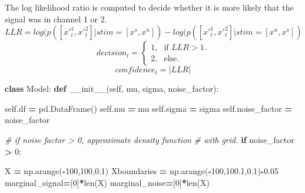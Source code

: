 \documentclass[12pt,twoside]{reedthesis}
\newenvironment{Shaded}{\begin{snugshade}}{\end{snugshade}}
\newcommand{\BuiltInTok}[1]{#1}
\newcommand{\CommentTok}[1]{\textcolor[rgb]{0.56,0.35,0.01}{\textit{#1}}}
\newcommand{\ControlFlowTok}[1]{\textcolor[rgb]{0.13,0.29,0.53}{\textbf{#1}}}
\newcommand{\DecValTok}[1]{\textcolor[rgb]{0.00,0.00,0.81}{#1}}
\newcommand{\FloatTok}[1]{\textcolor[rgb]{0.00,0.00,0.81}{#1}}
\newcommand{\FunctionTok}[1]{\textcolor[rgb]{0.00,0.00,0.00}{#1}}
\newcommand{\KeywordTok}[1]{\textcolor[rgb]{0.13,0.29,0.53}{\textbf{#1}}}
\newcommand{\NormalTok}[1]{#1}
\newcommand{\OperatorTok}[1]{\textcolor[rgb]{0.81,0.36,0.00}{\textbf{#1}}}
\newcommand{\VariableTok}[1]{\textcolor[rgb]{0.00,0.00,0.00}{#1}}
\begin{document}
The log likelihood ratio is computed to decide whether it is more likely that the signal was in channel 1 or 2.
\begin{equation}
LLR=log(p([x'^1_t,x'^2_t]|stim=[x^s,x^n])-log(p([x'^1_t,x'^2_t]|stim=[x^n,x^s])
\end{equation}
\begin{equation}
  decision_t=\begin{cases}
    \text{1}, & \text{if } LLR>1.\\
   \text{2}, & \text{else}.
    
  \end{cases}
\end{equation}
\begin{equation}
confidence_t = |LLR|
\end{equation}
\begin{Shaded}
\begin{Highlighting}[]
\KeywordTok{class}\NormalTok{ Model:}
    \KeywordTok{def} \FunctionTok{__init__}\NormalTok{(}\VariableTok{self}\NormalTok{, mu, sigma, noise_factor):}
        
        \VariableTok{self}\NormalTok{.df }\OperatorTok{=}\NormalTok{ pd.DataFrame()}
        \VariableTok{self}\NormalTok{.mu }\OperatorTok{=}\NormalTok{ mu}
        \VariableTok{self}\NormalTok{.sigma }\OperatorTok{=}\NormalTok{ sigma}
        \VariableTok{self}\NormalTok{.noise_factor }\OperatorTok{=}\NormalTok{ noise_factor}
        
        \CommentTok{# if noise factor > 0, approximate density function}
        \CommentTok{# with grid.}
        \ControlFlowTok{if}\NormalTok{ noise_factor }\OperatorTok{>} \DecValTok{0}\NormalTok{:}
        
\NormalTok{          X }\OperatorTok{=}\NormalTok{ np.arange(}\OperatorTok{-}\DecValTok{100}\NormalTok{,}\DecValTok{100}\NormalTok{,}\FloatTok{0.1}\NormalTok{)}
\NormalTok{          Xboundaries }\OperatorTok{=}\NormalTok{ np.arange(}\OperatorTok{-}\DecValTok{100}\NormalTok{,}\FloatTok{100.1}\NormalTok{,}\FloatTok{0.1}\NormalTok{)}\OperatorTok{-}\FloatTok{0.05}
\NormalTok{          marginal_signal}\OperatorTok{=}\NormalTok{[}\DecValTok{0}\NormalTok{]}\OperatorTok{*}\BuiltInTok{len}\NormalTok{(X)}
\NormalTok{          marginal_noise}\OperatorTok{=}\NormalTok{[}\DecValTok{0}\NormalTok{]}\OperatorTok{*}\BuiltInTok{len}\NormalTok{(X)}
          

\end{Highlighting}
\end{Shaded}
\end{document}
